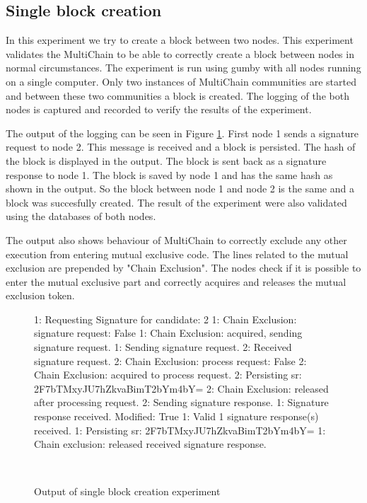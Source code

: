 \subsection{Single block creation}
In this experiment we try to create a block between two nodes.
This experiment validates the MultiChain to be able to correctly create a block between nodes in normal circumstances.
The experiment is run using gumby with all nodes running on a single computer.
Only two instances of MultiChain communities are started and between these two communities a block is created.
The logging of the both nodes is captured and recorded to verify the results of the experiment.

The output of the logging can be seen in Figure \ref{fig:singleblockexperiment}.
First node 1 sends a signature request to node 2.
This message is received and a block is persisted.
The hash of the block is displayed in the output.
The block is sent back as a signature response to node 1.
The block is saved by node 1 and has the same hash as shown in the output.
So the block between node 1 and node 2 is the same and a block was succesfully created.
The result of the experiment were also validated using the databases of both nodes.

The output also shows behaviour of MultiChain
to correctly exclude any other execution from entering mutual exclusive code.
The lines related to the mutual exclusion are prepended by "Chain Exclusion".
The nodes check if it is possible to enter the mutual exclusive part and correctly acquires
and releases the mutual exclusion token.

\begin{figure}
\begin{FVerbatim}[fontsize=\small]
1: Requesting Signature for candidate: 2
1: Chain Exclusion: signature request: False
1: Chain Exclusion: acquired, sending signature request.
1: Sending signature request.
2: Received signature request.
2: Chain Exclusion: process request: False
2: Chain Exclusion: acquired to process request.
2: Persisting sr: 2F7bTMxyJU7hZkvaBimT2bYm4bY=
2: Chain Exclusion: released after processing request.
2: Sending signature response.
1: Signature response received. Modified: True
1: Valid 1 signature response(s) received.
1: Persisting sr: 2F7bTMxyJU7hZkvaBimT2bYm4bY=
1: Chain exclusion: released received signature response.
\end{FVerbatim}
    \caption{Output of single block creation experiment}~\label{fig:singleblockexperiment}
\end{figure}

